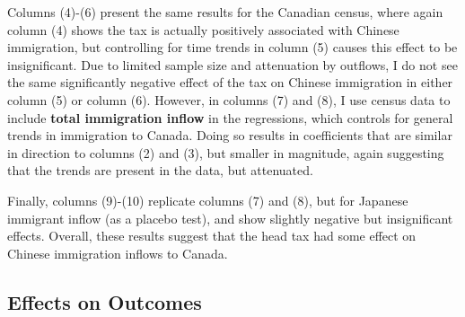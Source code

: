 \documentclass[12pt]{article}
\begin{document}
Columns (4)-(6) present the same results for the Canadian census, where again column (4) shows the tax is actually positively associated with Chinese immigration, but controlling for time trends in column (5) causes this effect to be insignificant. Due to limited sample size and attenuation by outflows, I do not see the same significantly negative effect of the tax on Chinese immigration in either column (5) or column (6). However, in columns (7) and (8), I use census data to include \textbf{total immigration inflow} in the regressions, which controls for general trends in immigration to Canada. Doing so results in coefficients that are similar in direction to columns (2) and (3), but smaller in magnitude, again suggesting that the trends are present in the data, but attenuated. 

Finally, columns (9)-(10) replicate columns (7) and (8), but for Japanese immigrant inflow (as a placebo test), and show slightly negative but insignificant effects. Overall, these results suggest that the head tax had some effect on Chinese immigration inflows to Canada.


\subsection{Effects on Outcomes}

\begin{table}[!h]
    \centering 
    \renewcommand{\arraystretch}{1.5}
\end{table}
\end{document}
